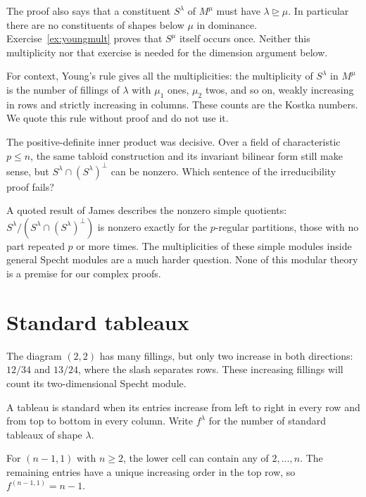 The proof also says that a constituent $S^\lambda$ of $M^\mu$ must have $\lambda\trianglerighteq\mu$. In particular there are no constituents of shapes below $\mu$ in dominance. Exercise~\ref{ex:youngmult} proves that $S^\mu$ itself occurs once. Neither this multiplicity nor that exercise is needed for the dimension argument below.

For context, Young's rule gives all the multiplicities: the multiplicity of $S^\lambda$ in $M^\mu$ is the number of fillings of $\lambda$ with $\mu_1$ ones, $\mu_2$ twos, and so on, weakly increasing in rows and strictly increasing in columns. These counts are the Kostka numbers. We quote this rule without proof and do not use it.

\begin{think}
The positive-definite inner product was decisive. Over a field of characteristic $p\le n$, the same tabloid construction and its invariant bilinear form still make sense, but $S^\lambda\cap(S^\lambda)^\perp$ can be nonzero. Which sentence of the irreducibility proof fails?

A quoted result of James describes the nonzero simple quotients: $S^\lambda/(S^\lambda\cap(S^\lambda)^\perp)$ is nonzero exactly for the $p$-regular partitions, those with no part repeated $p$ or more times. The multiplicities of these simple modules inside general Specht modules are a much harder question. None of this modular theory is a premise for our complex proofs.
\end{think}

\section{Standard tableaux}

The diagram $(2,2)$ has many fillings, but only two increase in both directions: $12/34$ and $13/24$, where the slash separates rows. These increasing fillings will count its two-dimensional Specht module.

\begin{definition}\label{def:standard}
A tableau is standard when its entries increase from left to right in every row and from top to bottom in every column. Write $f^\lambda$ for the number of standard tableaux of shape $\lambda$.
\end{definition}

For $(n-1,1)$ with $n\ge2$, the lower cell can contain any of $2,\ldots,n$. The remaining entries have a unique increasing order in the top row, so $f^{(n-1,1)}=n-1$.

